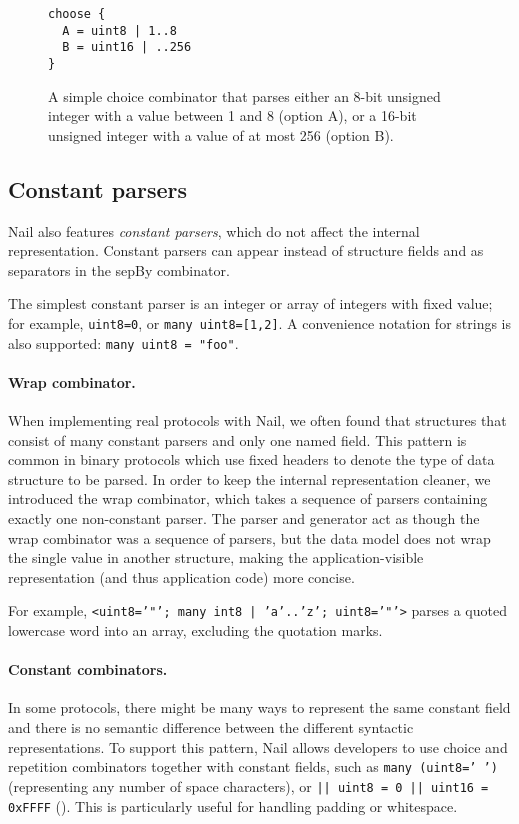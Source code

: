 \begin{figure}[tb]
\begin{verbatim}
choose {
  A = uint8 | 1..8
  B = uint16 | ..256
}
\end{verbatim}
\caption{A simple choice combinator that parses either an 8-bit unsigned
integer with a value between 1 and 8 (option A), or a 16-bit unsigned
integer with a value of at most 256 (option B).}
\label{fig:choice}
\end{figure}

\subsection{Constant parsers}

Nail also features \emph{constant parsers}, which do not affect the internal
representation. Constant parsers can appear instead of structure fields and as
separators in the sepBy combinator.

The simplest constant parser is an integer or array of integers with fixed
value; for example, \texttt{uint8=0}, or \texttt{many uint8=[1,2]}. A convenience notation
for strings is also supported: \texttt{many uint8 = "foo"}.

\paragraph{Wrap combinator.} When implementing real protocols with Nail, we often found that
structures that consist of many constant parsers and only one named field. This pattern is
common in binary protocols which use fixed headers to denote the type of data
structure to be parsed.  In order to keep the internal representation cleaner,
we introduced the wrap combinator, which takes a sequence of parsers containing
exactly one non-constant parser. The parser and generator act as though the wrap
combinator was a sequence of parsers, but the data model does not wrap the
single value in another structure, making the application-visible representation
(and thus application code) more concise.

For example, \texttt{<uint8='"'; many int8 | 'a'..'z'; uint8='"'>} parses a quoted
lowercase word into an array, excluding the quotation marks.

\paragraph{Constant combinators.}
In some protocols, there might be many ways to represent the same constant field
and there is no semantic difference between the different syntactic representations.
To support this pattern, Nail allows developers to use choice and repetition
combinators together with constant fields, such as
\texttt{many (uint8=' ')} (representing any number of space characters), or
\texttt{|| uint8 = 0 || uint16 = 0xFFFF} ().
This is particularly useful for handling padding or whitespace.

